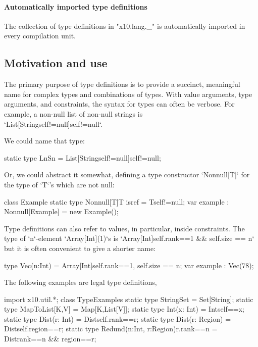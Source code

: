 \paragraph{Automatically imported type definitions}
\label{X10LangUnderscore}

The collection of type definitions in
\xcdmath"x10.lang._" is automatically imported in every compilation unit.


\subsection{Motivation and use}
The primary purpose of type definitions is to provide a succinct,
meaningful name for complex types
and combinations of types. 
With value arguments, type arguments, and constraints, the syntax for \Xten{}
types can often be verbose. 
For example, a non-null list of non-null strings is \\
\xcd`List[String{self!=null}]{self!=null}`.

We could name that type: 
% 
\begin{xten}
static type LnSn = List[String{self!=null}]{self!=null};
\end{xten}
Or, we could abstract it somewhat, defining a type constructor
\xcd`Nonnull[T]` for the type of \xcd`T`'s which are not null:
% 
\begin{xten}
class Example {
  static type Nonnull[T]{T isref}  = T{self!=null};
  var example : Nonnull[Example] = new Example();
}
\end{xten}
%

Type definitions can also refer to values, in particular, inside 
constraints.  The type of \xcd`n`-element \xcd`Array[Int](1)`s  is 
\xcd`Array[Int]{self.rank==1 && self.size == n}`
but it is often convenient to give a shorter name: 
\begin{xten}
type Vec(n:Int) = Array[Int]{self.rank==1, self.size == n}; 
var example : Vec(78); 
\end{xten}

%
The following examples are legal type definitions, 
% 
\begin{xten}
import x10.util.*;
class TypeExamples {
  static type StringSet = Set[String];
  static type MapToList[K,V] = Map[K,List[V]];
  static type Int(x: Int) = Int{self==x};
  static type Dist(r: Int) = Dist{self.rank==r};
  static type Dist(r: Region) = Dist{self.region==r};
  static type Redund(n:Int, r:Region){r.rank==n} 
      = Dist{rank==n && region==r};
}
\end{xten}
% 

